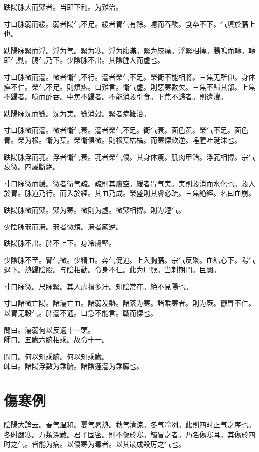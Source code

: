 \documentclass[12pt,oneside,UTF8,b5paper]{ctexbook}她她她她她她她
\begin{document}
趺陽脉大而緊者。当即下利。为難治。

寸口脉弱而緩。弱者陽气不足。緩者胃气有餘。噫而吞酸。食卒不下。气填於膈上也。

趺陽脉緊而浮。浮为气。緊为寒。浮为腹滿。緊为絞痛。浮緊相摶。腸鳴而轉。轉即气動。膈气乃下。少陰脉不出。其陰腫大而虚也。

寸口脉微而濇。微者衛气不行。濇者榮气不足。榮衛不能相將。三焦无所仰。身体痹不仁。榮气不足。則煩疼。口難言。衛气虚。則惡寒數欠。三焦不歸其部。上焦不歸者。噫而酢吞。中焦不歸者。不能消穀引食。下焦不歸者。則遺溲。

趺陽脉沈而數。沈为実。數消穀。緊者病難治。

寸口脉微而濇。微者衛气衰。濇者榮气不足。衛气衰。面色黄。榮气不足。面色青。榮为根。衛为葉。榮衛俱微。則根葉枯槁。而寒慄欬逆。唾腥吐涎沫也。

趺陽脉浮而芤。浮者衛气衰。芤者榮气傷。其身体瘦。肌肉甲錯。浮芤相摶。宗气衰微。四屬斷絶。

寸口脉微而緩。微者衛气疏。疏則其膚空。緩者胃气実。実則穀消而水化也。穀入於胃。脉道乃行。而入於經。其血乃成。榮盛則其膚必疏。三焦絶經。名曰血崩。

趺陽脉微而緊。緊为寒。微則为虚。微緊相摶。則为短气。

少陰脉弱而濇。弱者微煩。濇者厥逆。

趺陽脉不出。脾不上下。身冷膚堅。

少陰脉不至。腎气微。少精血。奔气促迫。上入胸膈。宗气反聚。血結心下。陽气退下。熱歸陰股。与陰相動。令身不仁。此为尸厥。当刺期門。巨闕。

寸口脉微。尺脉緊。其人虚損多汗。知陰常在。絶不見陽也。

寸口諸微亡陽。諸濡亡血。諸弱发熱。諸緊为寒。諸乘寒者。則为厥。鬱冒不仁。以胃无穀气。脾濇不通。口急不能言。戰而慄也。

問曰。濡弱何以反適十一頭。\\
師曰。五臓六腑相乘。故令十一。

問曰。何以知乘腑。何以知乘臓。\\
師曰。諸陽浮數为乘腑。諸陰遲濇为乘臓也。

\chapter{傷寒例}

陰陽大論云。春气温和。夏气暑熱。秋气清涼。冬气冷冽。此則四时正气之序也。冬时嚴寒。万類深藏。君子固密。則不傷於寒。觸冒之者。乃名傷寒耳。其傷於四时之气。皆能为病。以傷寒为毒者。以其最成殺厉之气也。
\end{document}
